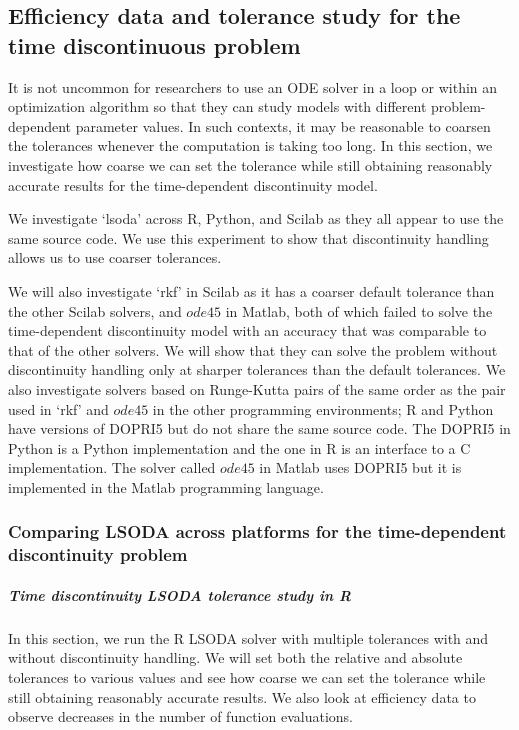 \subsection{Efficiency data and tolerance study for the time discontinuous problem}
\label{subsection:time_tolerance_study}
It is not uncommon for researchers to use an ODE solver in a loop or within an optimization algorithm so that they can study models with different problem-dependent parameter values. In such contexts, it may be reasonable to coarsen the tolerances whenever the computation is taking too long. In this section, we investigate how coarse we can set the tolerance while still obtaining reasonably accurate results for the time-dependent discontinuity model. 

We investigate `lsoda' across R, Python, and Scilab as they all appear to use the same source code. We use this experiment to show that discontinuity handling allows us to use coarser tolerances.

We will also investigate `rkf' in Scilab as it has a coarser default tolerance than the other Scilab solvers, and $ode45$ in Matlab, both of which failed to solve the time-dependent discontinuity model with an accuracy that was comparable to that of the other solvers. We will show that they can solve the problem without discontinuity handling only at sharper tolerances than the default tolerances. We also investigate solvers based on Runge-Kutta pairs of the same order as the pair used in `rkf' and $ode45$ in the other programming environments; R and Python have versions of DOPRI5 but do not share the same source code. The DOPRI5 in Python is a Python implementation and the one in R is an interface to a C implementation. The solver called $ode45$ in Matlab uses DOPRI5 but it is implemented in the Matlab programming language.

\subsubsection{Comparing LSODA across platforms for the time-dependent discontinuity problem}
\subparagraph{Time discontinuity LSODA tolerance study in R}
In this section, we run the R LSODA solver with multiple tolerances with and without discontinuity handling. We will set both the relative and absolute tolerances to various values and see how coarse we can set the tolerance while still obtaining reasonably accurate results. We also look at efficiency data to observe decreases in the number of function evaluations.

